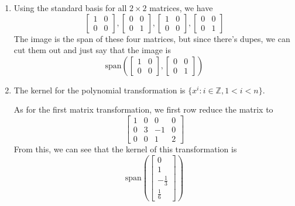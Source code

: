 \documentclass[12pt]{article}
\begin{document}
\begin{enumerate}
\begin{enumerate}
\begin{enumerate}
                        \item Using the standard basis for all $2 \times 2$ matrices, we have
                              \[\begin{bmatrix}
                                      1 & 0 \\ 0 & 0
                                  \end{bmatrix}, \begin{bmatrix}
                                      0 & 0 \\ 0 & 1
                                  \end{bmatrix}, \begin{bmatrix}
                                      1 & 0 \\ 0 & 0
                                  \end{bmatrix}, \begin{bmatrix}
                                      0 & 0 \\ 0 & 1
                                  \end{bmatrix}\]
                              The image is the span of these four matrices, but since there's dupes,
                              we can cut them out and just say that the image is
                              \[\boxed{\text{span}\left(\begin{bmatrix}
                                              1 & 0 \\ 0 & 0
                                          \end{bmatrix}, \begin{bmatrix}
                                              0 & 0 \\ 0 & 1
                                          \end{bmatrix}\right)}\]

                        \item The kernel for the polynomial transformation is $\{x^i: i \in \mathbb{Z}, 1<i<n\}$.

                              As for the first matrix transformation, we first row reduce the matrix to
                              \[\begin{bmatrix}
                                      1 & 0 & 0  & 0 \\
                                      0 & 3 & -1 & 0 \\
                                      0 & 0 & 1  & 2
                                  \end{bmatrix}\]
                              From this, we can see that the kernel of this transformation is
                              \[\text{span}\left(\begin{bmatrix}
                                          0 \\ 1 \\ -\frac{1}{3} \\ \frac{1}{6}
                                      \end{bmatrix}\right)\]


\end{enumerate}
\end{enumerate}
\end{enumerate}
\end{document}
